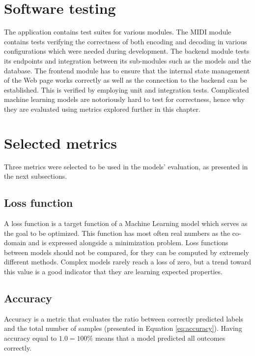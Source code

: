 \documentclass[a4paper, 11pt, twoside]{report}
\theoremstyle{definition}
\begin{document}
\section{Software testing}

The application contains test suites for various modules. The MIDI module contains tests verifying the correctness of both encoding and decoding in various configurations which were needed during development. The backend module tests its endpoints and integration between its sub-modules such as the models and the database. The frontend module has to ensure that the internal state management of the Web page works correctly as well as the connection to the backend can be established. This is verified by employing unit and integration tests. Complicated machine learning models are notoriously hard to test for correctness, hence why they are evaluated using metrics explored further in this chapter. \par


\section{Selected metrics}

Three metrics were selected to be used in the models' evaluation, as presented in the next subsections. \par

\subsection{Loss function}

A loss function is a target function of a Machine Learning model which serves as the goal to be optimized. This function has most often real numbers as the co-domain and is expressed alongside a minimization problem. Loss functions between models should not be compared, for they can be computed by extremely different methods. Complex models rarely reach a loss of zero, but a trend toward this value is a good indicator that they are learning expected properties. \par

\subsection{Accuracy}

Accuracy is a metric that evaluates the ratio between correctly predicted labels and the total number of samples (presented in Equation \ref{eq:accuracy}). Having accuracy equal to $1.0 = 100\%$ means that a model predicted all outcomes correctly. \par
\end{document}
